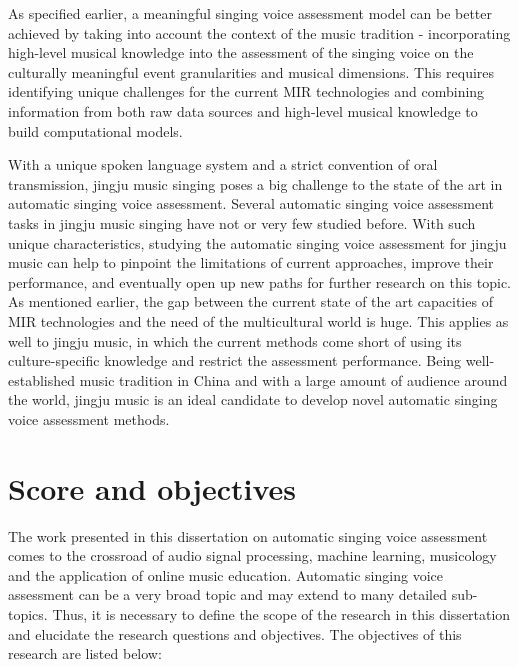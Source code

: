 As specified earlier, a meaningful singing voice assessment model can be better achieved by taking into account the context of the music tradition - incorporating high-level musical knowledge into the assessment of the singing voice on the culturally meaningful event granularities and musical dimensions. This requires identifying unique challenges for the current MIR technologies and combining information from both raw data sources and high-level musical knowledge to build computational models.

With a unique spoken language system and a strict convention of oral transmission, jingju music singing poses a big challenge to the state of the art in automatic singing voice assessment. Several automatic singing voice assessment tasks in jingju music singing have not or very few studied before. With such unique characteristics, studying the automatic singing voice assessment for jingju music can help to pinpoint the limitations of current approaches, improve their performance, and eventually open up new paths for further research on this topic. As mentioned earlier, the gap between the current state of the art capacities of MIR technologies and the need of the multicultural world is huge. This applies as well to jingju music, in which the current methods come short of using its culture-specific knowledge and restrict the assessment performance. Being well-established music tradition in China and with a large amount of audience around the world, jingju music is an ideal candidate to develop novel automatic singing voice assessment methods.

\section{Score and objectives}

The work presented in this dissertation on automatic singing voice assessment comes to the crossroad of audio signal processing, machine learning, musicology and the application of online music education. Automatic singing voice assessment can be a very broad topic and may extend to many detailed sub-topics. Thus, it is necessary to define the scope of the research in this dissertation and elucidate the research questions and objectives. The objectives of this research are listed below:


